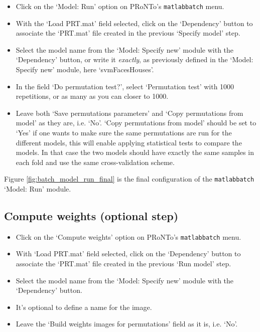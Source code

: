 \begin{itemize}

	\item Click on the `Model: Run' option on PRoNTo's {\tt matlabbatch} menu.
	
	\item  With the `Load PRT.mat' field selected, click on the `Dependency' button to associate the `PRT.mat' file created in the previous `Specify model' step.
	
	\item Select the model name from the `Model: Specify new' module with the `Dependency' button, or write it {\it exactly}, as previously defined in the `Model: Specify new' module, here `svmFacesHouses'.

	\item In the field `Do permutation test?', select `Permutation test' with 1000 repetitions, or as many as you can closer to 1000.
	
	\item Leave both `Save permutations parameters' and `Copy permutations from model' as they are, i.e. `No'. `Copy permutations from model' should be set to `Yes' if one wants to make sure the same permutations are run for the different models, this will enable applying statistical tests to compare the models. In that case the two models should have exactly the same samples in each fold and use the same cross-validation scheme.

\end{itemize}

Figure \ref{fig:batch_model_run_final} is the final configuration of the {\tt matlabbatch} `Model: Run' module.

\subsection{Compute weights (optional step)}

\begin{itemize}

	\item Click on the `Compute weights' option on PRoNTo's {\tt matlabbatch} menu.

	\item With `Load PRT.mat' field selected, click on the `Dependency' button to associate the `PRT.mat' file created in the previous `Run model' step.
	
	\item Select the model name from the `Model: Specify new' module with the `Dependency' button.
	
	\item It's optional to define a name for the image. 
	
	\item Leave the `Build weights images for permutations' field as it is, i.e. `No'. 

\end{itemize}

